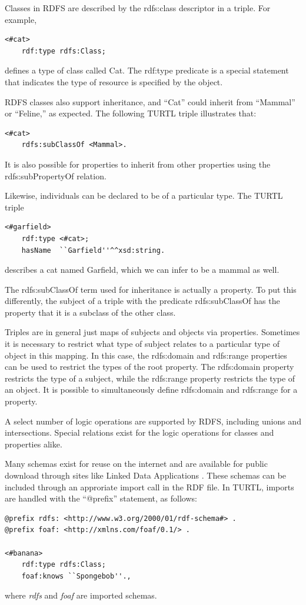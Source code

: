 Classes in RDFS are described by the rdfs:class descriptor in a triple. For
example,
\begin{lstlisting}[language=TURTL]
<#cat>
    rdf:type rdfs:Class;
\end{lstlisting}
defines a type of class called Cat. The rdf:type predicate is a special
statement that indicates the type of resource is specified by the
object. 

RDFS classes also support inheritance, and ``Cat'' could inherit from
``Mammal'' or ``Feline,'' as expected. The following TURTL triple illustrates
that:
\begin{lstlisting}[language=TURTL]
<#cat>
    rdfs:subClassOf <Mammal>.
\end{lstlisting}
It is also possible for properties to inherit from other properties using the
rdfs:subPropertyOf relation.

Likewise, individuals can be declared to be of a particular type. The TURTL
triple
\begin{lstlisting}[language=TURTL]
<#garfield>
    rdf:type <#cat>;
    hasName  ``Garfield''^^xsd:string.
\end{lstlisting}
describes a cat named Garfield, which we can infer to be a mammal as well.

The rdfs:subClassOf term used for inheritance is actually a property. To put
this differently, the subject of a triple with the predicate rdfs:subClassOf
has the property that it is a subclass of the other class. 

Triples are in general just maps of subjects and objects via properties.
Sometimes it is necessary to restrict what type of subject relates to a
particular type of object in this mapping. In this case, the rdfs:domain and
rdfs:range properties can be used to restrict the types of the root property.
The rdfs:domain property restricts the type of a subject, while the rdfs:range
property restricts the type of an object. It is possible to simultaneously
define rdfs:domain and rdfs:range for a property.

A select number of logic operations are supported by RDFS, including unions and
intersections. Special relations exist for the logic operations for classes and
properties alike.

Many schemas exist for reuse on the internet and are available for
public download through sites like Linked Data Applications
\cite{lov}. These schemas can be included through an approriate import
call in the RDF file. In TURTL, imports are handled with the ``@prefix''
statement, as follows:
\begin{lstlisting}[language=TURTL]
@prefix rdfs: <http://www.w3.org/2000/01/rdf-schema#> .
@prefix foaf: <http://xmlns.com/foaf/0.1/> .

<#banana>
    rdf:type rdfs:Class;
    foaf:knows ``Spongebob''.,
\end{lstlisting}
where \textit{rdfs} and \textit{foaf} are imported schemas.

